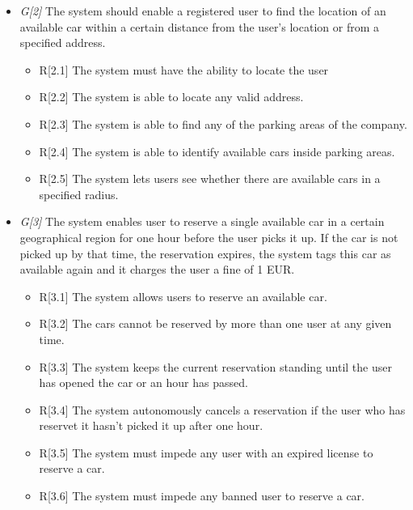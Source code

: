 \begin{itemize}
				\item \textit{G[2]} The system should enable a registered user to find the location of an available car within a certain distance from the user's location or from a specified address.
					\begin{itemize}
						\item R[2.1] The system must have the ability to locate the user %
						\item R[2.2] The system is able to locate any valid address.
						\item R[2.3] The system is able to find any of the parking areas of the company. 
						\item R[2.4] The system is able to identify available cars inside parking areas.
						\item R[2.5] The system lets users see whether there are available cars in a specified radius. %
					\end{itemize}
					
				\item \textit{G[3]} The system enables user to reserve a single available car in a certain geographical region for one hour before the user picks it up. If the car is not picked up by that time, the reservation expires, the system tags this car as available again and it charges the user a fine of 1 EUR.
					\begin{itemize}
						\item R[3.1] The system allows users to reserve an available car.
						\item R[3.2] The cars cannot be reserved by more than one user at any given time.
						\item R[3.3] The system keeps the current reservation standing until the user has opened the car or an hour has passed. %
						\item R[3.4] The system autonomously cancels a reservation if the user who has reservet it hasn't picked it up after one hour.
						
						\item R[3.5] The system must impede any user with an expired license to reserve a car.
						\item R[3.6] The system must impede any banned user to reserve a car.
					\end{itemize}


\end{itemize}
